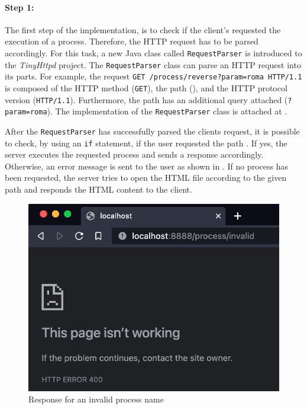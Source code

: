 \paragraph{Step 1:}
The first step of the implementation, is to check if the client's requested the execution of a process. Therefore, the HTTP request has to be parsed accordingly. For this task, a new Java class called \texttt{RequestParser} is introduced to the \textit{TinyHttpd} project. The \texttt{RequestParser} class can parse an HTTP request into its parts. For example, the request \texttt{GET /process/reverse?param=roma HTTP/1.1} is composed of the HTTP method (\texttt{GET}), the path (), and the HTTP protocol version (\texttt{HTTP/1.1}). Furthermore, the path has an additional query attached (\texttt{?param=roma}). The implementation of the \texttt{RequestParser} class is attached at .


After the \texttt{RequestParser} has successfully parsed the clients request, it is possible to check, by using an \texttt{if} statement, if the user requested the path . If yes, the server executes the requested process and sends a response accordingly. Otherwise, an error message is sent to the user as shown in . If no process has been requested, the server tries to open the HTML file according to the given path and responds the HTML content to the client.

\begin{figure}[h]
\centering
\includegraphics[scale=0.4]{images/invalidProcess}
\caption{Response for an invalid process name}
\label{fig:01_part1_impl_tinyhttpd_invalidprocess}
\end{figure}


